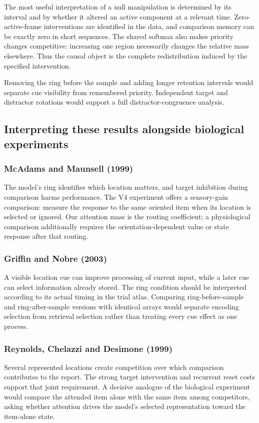 \documentclass[11pt]{article}
\begin{document}
The most useful interpretation of a null manipulation is determined by its interval and by whether it altered an active component at a relevant time. Zero-active-frame interventions are identified in the data, and comparison memory can be exactly zero in short sequences. The shared softmax also makes priority changes competitive: increasing one region necessarily changes the relative mass elsewhere. Thus the causal object is the complete redistribution induced by the specified intervention.

Removing the ring before the sample and adding longer retention intervals would separate cue visibility from remembered priority. Independent target and distractor rotations would support a full distractor-congruence analysis.

\subsection{Interpreting these results alongside biological experiments}
\subsubsection{McAdams and Maunsell (1999)}
The model’s ring identifies which location matters, and target inhibition during comparison harms performance. The V4 experiment offers a sensory-gain comparison: measure the response to the same oriented item when its location is selected or ignored. Our attention mass is the routing coefficient; a physiological comparison additionally requires the orientation-dependent value or state response after that routing. \cite{bio_mcadams}

\subsubsection{Griffin and Nobre (2003)}
A visible location cue can improve processing of current input, while a later cue can select information already stored. The ring condition should be interpreted according to its actual timing in the trial atlas. Comparing ring-before-sample and ring-after-sample versions with identical arrays would separate encoding selection from retrieval selection rather than treating every cue effect as one process. \cite{bio_griffin}

\subsubsection{Reynolds, Chelazzi and Desimone (1999)}
Several represented locations create competition over which comparison contributes to the report. The strong target intervention and recurrent reset costs support that joint requirement. A decisive analogue of the biological experiment would compare the attended item alone with the same item among competitors, asking whether attention drives the model’s selected representation toward the item-alone state. \cite{bio_competition}
\end{document}
